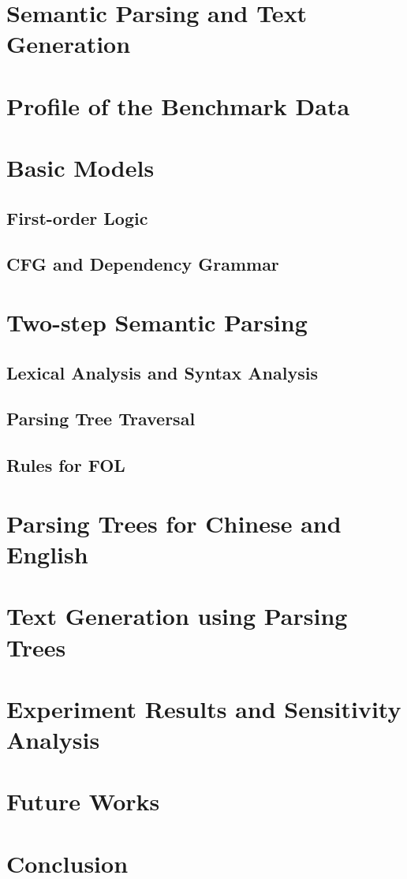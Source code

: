 \documentclass{article}
\begin{document}
\section{Semantic Parsing and Text Generation}{}

\section{Profile of the Benchmark Data}{}

\section{Basic Models}{
	\subsection{First-order Logic}{}

	\subsection{CFG and Dependency Grammar}{}
}

\section{Two-step Semantic Parsing}{
	\subsection{Lexical Analysis and Syntax Analysis}{}

	\subsection{Parsing Tree Traversal}{}

	\subsection{Rules for FOL}{}
}

\section{Parsing Trees for Chinese and English}{}

\section{Text Generation using Parsing Trees}{}

\section{Experiment Results and Sensitivity Analysis}{}

\section{Future Works}{}

\section{Conclusion}{}



\citation
\end{document}
